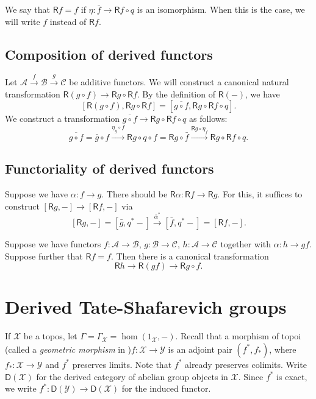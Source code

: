 \documentclass{amsart}
\newcommand{\cA}{\mathcal{A}}
\newcommand{\cB}{\mathcal{B}}
\newcommand{\cC}{\mathcal{C}}
\newcommand{\cX}{\mathcal{X}}
\newcommand{\cY}{\mathcal{Y}}
\newcommand{\eD}{\mathsf{D}}
\newcommand{\eR}{\mathsf{R}}
\begin{document}
We say that $\eR f=f$ if $\eta:\bar f\to \eR f\circ q$ is an isomorphism. When 
this is the case, we will write $f$ instead of $\eR f$. 


\subsection{Composition of derived functors}

Let $\cA\xrightarrow f \cB\xrightarrow g \cC$ be additive functors. We will 
construct a canonical natural transformation 
$\eR(g\circ f) \to \eR g\circ \eR f$. By the definition of $\eR(-)$, we have 
\[
  [\eR(g\circ f),\eR g\circ \eR f] = [\overline{g\circ f},\eR g\circ \eR f\circ q] .
\]
We construct a transformation $\overline{g\circ f}\to\eR g\circ \eR f\circ q$ 
as follows:
\[
  \overline{g\circ f} = \bar g\circ f\xrightarrow{\eta_g\circ f} \eR g\circ q \circ f = \eR g\circ \bar f \xrightarrow{\eR g\circ \eta_f} \eR g\circ \eR f\circ q .
\]



\subsection{Functoriality of derived functors}

Suppose we have $\alpha:f\to g$. There should be 
$\eR \alpha:\eR f\to \eR g$. For this, it suffices to construct 
$[\eR g,-] \to [\eR f,-]$ via 
\[
  [\eR g,-] = [\bar g,q^\ast -] \xrightarrow{\bar\alpha^\ast} [\bar f,q^\ast -] = [\eR f,-] .
\]

Suppose we have functors $f:\cA\to \cB$, $g:\cB\to \cC$, 
$h:\cA\to \cC$ together with $\alpha:h\to g f$. Suppose further that $\eR f=f$. 
Then there is a canonical transformation 
\[
  \eR h \to \eR(g f) \to \eR g\circ f .
\]





\section{Derived Tate-Shafarevich groups}

If $\cX$ be a topos, let $\Gamma=\Gamma_\cX=\hom(1_\cX,-)$. Recall that a 
morphism of topoi (called a \emph{geometric morphism} in 
\cite{maclane-moerdijk-1994})$f:\cX\to \cY$ is an adjoint pair 
$(f^\ast,f_\ast)$, where $f_\ast:\cX\to \cY$ and $f^\ast$ preserves limits. Note 
that $f^\ast$ already preserves colimits. Write $\eD(\cX)$ for the derived 
category of abelian group objects in $\cX$. Since $f^\ast$ is exact, we write 
$f^\ast:\eD(\cY) \to \eD(\cX)$ for the induced functor. 
\end{document}
